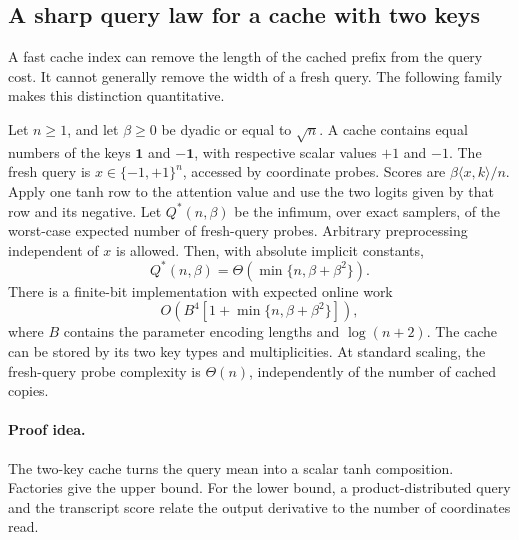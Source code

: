 \subsection{A sharp query law for a cache with two keys}
\label{sec:rankonequerylaw}

A fast cache index can remove the length of the cached prefix from
the query cost. It cannot generally remove the width of a fresh
query. The following family makes this distinction quantitative.

\begin{theorem}
\label{thm:rankonequerylaw}
Let $n\ge1$, and let $\beta\ge0$ be dyadic or equal to $\sqrt n$.
A cache contains equal numbers of the
keys $\mathbf1$ and $-\mathbf1$, with respective scalar values $+1$
and $-1$. The fresh query is $x\in\{-1,+1\}^n$, accessed by coordinate
probes. Scores are $\beta\langle x,k\rangle/n$. Apply one tanh row
to the attention value and use the two logits given by that row and
its negative. Let $Q^*(n,\beta)$ be the infimum, over exact samplers,
of the worst-case expected number of fresh-query probes. Arbitrary
preprocessing independent of $x$ is allowed. Then, with absolute
implicit constants,
\[
 Q^*(n,\beta)=\Theta\!\left(\min\{n,\beta+\beta^2\}\right).
\]
There is a finite-bit implementation with expected online work
\[
 O\!\left(B^4\left[1+\min\{n,\beta+\beta^2\}\right]\right),
\]
where $B$ contains the parameter encoding lengths and $\log(n+2)$.
The cache can be stored by its two key types and multiplicities.
At standard scaling, the fresh-query probe complexity is $\Theta(n)$,
independently of the number of cached copies.
\end{theorem}
\paragraph{Proof idea.}
The two-key cache turns the query mean into a scalar tanh composition.  Factories give the upper bound.  For the lower bound, a product-distributed query and the transcript score relate the output derivative to the number of coordinates read.

